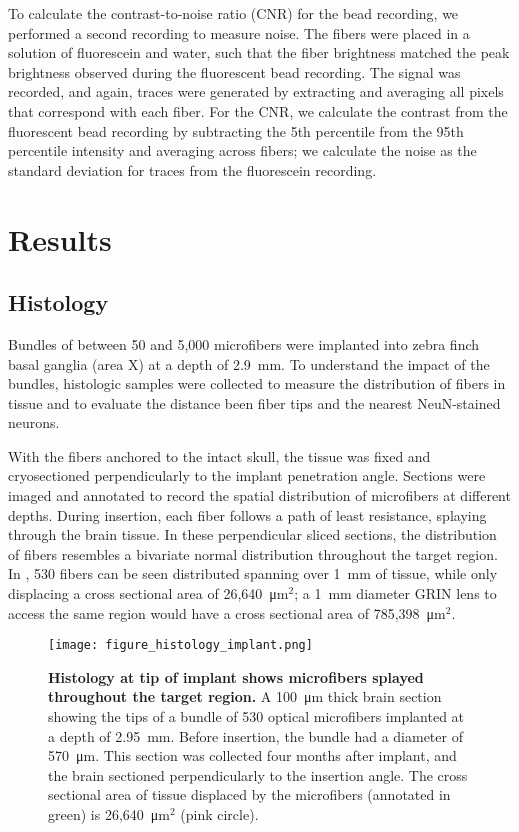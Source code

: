 To calculate the contrast-to-noise ratio (CNR) for the bead recording, 
we performed a second recording to measure noise. The fibers were placed 
in a solution of fluorescein and water, such that the fiber brightness 
matched the peak brightness observed during the fluorescent bead recording. 
The signal was recorded, and again, traces were generated by extracting 
and averaging all pixels that correspond with each fiber. For the CNR, we 
calculate the contrast from the fluorescent bead recording by subtracting 
the 5th percentile from the 95th percentile intensity and averaging across 
fibers; we calculate the noise as the standard deviation for traces from 
the fluorescein recording.

\section{Results}

\subsection{Histology}
\label{sec:results-histology}

Bundles of between 50 and 5,000 microfibers were implanted into 
zebra finch basal ganglia (area X) at a depth of 2.9~mm. To 
understand the impact of the bundles, histologic samples 
were collected to measure the distribution of 
fibers in tissue and to evaluate the distance been fiber tips and 
the nearest NeuN-stained neurons.

With the fibers anchored to the intact skull, the tissue was 
fixed and cryosectioned perpendicularly to the implant penetration 
angle. Sections were imaged and annotated to record the spatial 
distribution of microfibers at different depths. During insertion, 
each fiber follows a path of least resistance, splaying through 
the brain tissue. In these perpendicular sliced sections, the 
distribution of fibers resembles a bivariate normal distribution 
throughout the target region. In , 530 fibers can 
be seen distributed spanning over 1~mm of tissue, while only 
displacing a cross sectional area of 26,640~\si{\micro\meter}$^2$; a 
1~mm diameter GRIN lens to access the same region would have a 
cross sectional area of 785,398~\si{\micro\meter}$^2$.

\begin{figure}
\texttt{[image: figure\_histology\_implant.png]}
\caption[Histology showing microfibers splayed 
throughout target region.]{\textbf{Histology at tip of implant shows 
microfibers splayed throughout the target region.} 
A 100~\si{\micro\meter} thick brain section showing the tips of a 
bundle of 530 optical microfibers implanted at a 
depth of 2.95~mm. Before insertion, the bundle had a 
diameter of 570~\si{\micro\meter}. This section was 
collected four months after implant, and the brain sectioned 
perpendicularly to the insertion angle. The cross sectional  
area of tissue displaced by the microfibers 
(annotated in green) is 26,640~\si{\micro\meter}$^2$ 
(pink circle).}
\label{fig:histology_implant}
\end{figure}

